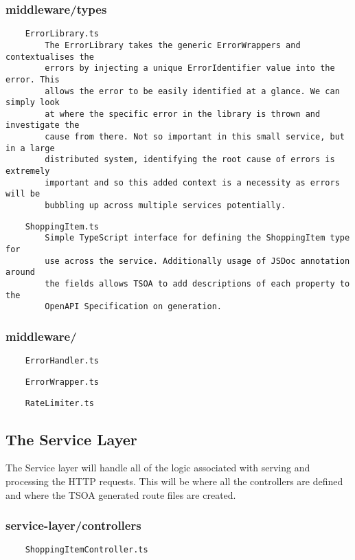 \subsubsection{middleware/types}
\begin{verbatim}
    ErrorLibrary.ts
        The ErrorLibrary takes the generic ErrorWrappers and contextualises the
        errors by injecting a unique ErrorIdentifier value into the error. This
        allows the error to be easily identified at a glance. We can simply look
        at where the specific error in the library is thrown and investigate the
        cause from there. Not so important in this small service, but in a large
        distributed system, identifying the root cause of errors is extremely
        important and so this added context is a necessity as errors will be 
        bubbling up across multiple services potentially.
\end{verbatim}
\begin{verbatim}
    ShoppingItem.ts
        Simple TypeScript interface for defining the ShoppingItem type for
        use across the service. Additionally usage of JSDoc annotation around
        the fields allows TSOA to add descriptions of each property to the
        OpenAPI Specification on generation.
\end{verbatim}
\subsubsection{middleware/}
\begin{verbatim}
    ErrorHandler.ts
\end{verbatim}
\begin{verbatim}
    ErrorWrapper.ts
\end{verbatim}
\begin{verbatim}
    RateLimiter.ts
\end{verbatim}
\subsection{The Service Layer}
The Service layer will handle all of the logic associated with serving and processing the HTTP requests. This will be where all the controllers are defined and where the TSOA generated route files are created.
\subsubsection{service-layer/controllers}
\begin{verbatim}
    ShoppingItemController.ts
\end{verbatim}
